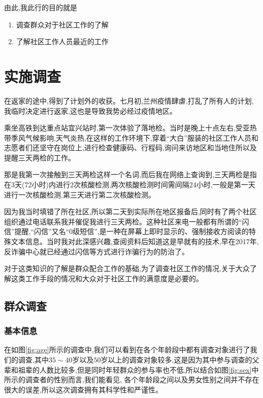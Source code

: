 \documentclass[AutoFakeBold]{LZUThesis}
\begin{document}
由此,我此行的目的就是

\begin{enumerate}
    \item 调查群众对于社区工作的了解
    \item 了解社区工作人员最近的工作
\end{enumerate}

\chapter{实施调查}

在返家的途中,得到了计划外的收获。七月初,兰州疫情肆虐,打乱了所有人的计划,我临时决定进行返家,这也是导致我势必经过疫情地区。

乘坐高铁到达重点站宜兴站时,第一次体验了落地检。当时是晚上十点左右,受亚热带季风气候影响,天气炎热,在这样的工作环境下,穿着“大白”服装的社区工作人员和志愿者们还坚守在岗位上,进行检查健康码、行程码,询问来访地区和当地住所以及提醒三天两检的工作。

那是我第一次接触到三天两检这样一个名词,而后我在网络上查询到,三天两检是指在3天(72小时)内进行2次核酸检测,两次核酸检测时间需间隔24小时,一般是第一天进行一次核酸检测,第三天进行第二次核酸检测。

因为我当时填错了所在社区,所以第二天到实际所在地区报备后,同时有了两个社区组织通过电话联系我并催促我进行三天两检。这种社区来电一般都有所谓的“闪信”提醒,“闪信”又名“0级短信”,是一种在屏幕上即时显示的、强制接收方阅读的特殊文本信息。当时我对此深感兴趣,查阅资料后知道这是早就有的技术,早在2017年,反诈骗中心就已经通过闪信等方式进行诈骗行为的防治了。

对于这类知识的了解是群众配合工作的基础,为了调查社区工作的情况,关于大众了解这类工作手段的情况和大众对于社区工作的满意度是必要的。


\section{群众调查}

\subsection{基本信息}

在如图\ref{fig:age}所示的调查中,我们可以看到在各个年龄段中都有调查对象进行了我们的调查,其中$35 \sim 40$岁以及$50$岁以上的调查对象较多,这是因为其中参与调查的父辈和祖辈的人数比较多,但是同时年轻群众的参与率也不低,所以结合如图\ref{fig:sex}中所示的调查者的性别而言,我们能看见, 各个年龄段之间以及男女性别之间并不存在很大的误差,所以这次调查拥有其科学性和严谨性。
\end{document}
